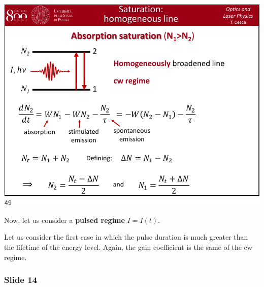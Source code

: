 \documentclass[../main/main.tex]{subfiles}
\begin{document}
\begin{minipage}[]{0.5\linewidth}
\centering
\includegraphics[page=13,width=1\textwidth]{../lessons/pdf_file/10_lecture.pdf}
\end{minipage}
\hspace{0.3cm}\vspace{0.3cm}
\begin{minipage}[c]{0.47\linewidth}

Now, let us consider a \textbf{pulsed regime} \( I = I(t) \).

Let us consider the first case in which the pulse duration is much greater than the lifetime of the energy level.
Again, the gain coefficient is the same of the cw regime.

\end{minipage}

\subsubsection*{Slide 14}
\end{document}
